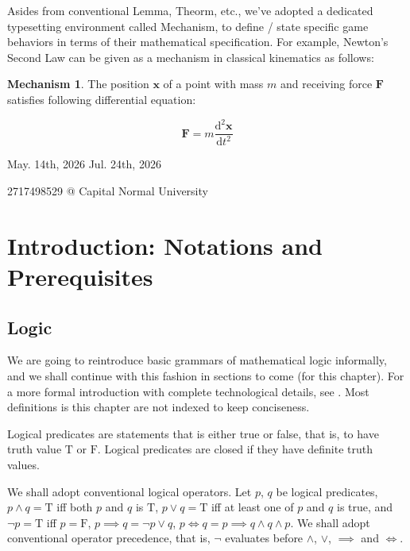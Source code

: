 \documentclass{book}
\theoremstyle{definition}\newtheorem{mechanism}{Mechanism}
\theoremstyle{remark}\newtheorem*{remark}{Remark}
\newcommand{\true}{\mathrm{T}}
\newcommand{\false}{\mathrm{F}}
\begin{document}
Asides from conventional Lemma, Theorm, etc., we've adopted a dedicated typesetting environment called Mechanism, to define / state specific game behaviors in terms of their mathematical specification. For example, Newton's Second Law can be given as a mechanism in classical kinematics as follows:

\begin{mechanism}
	The position $\boldsymbol{x}$ of a point with mass $m$ and receiving force $\boldsymbol{F}$ satisfies following differential equation:
	
	\begin{equation*}
		\boldsymbol{F} = m\frac{\mathrm{d}^2\boldsymbol{x}}{\mathrm dt^2}
	\end{equation*}
\end{mechanism}

\begin{flushright}
	May. 14th, 2026
	Jul. 24th, 2026 
	
	2717498529 @ Capital Normal University
\end{flushright}

\tableofcontents

\mainmatter

\chapter{Introduction: Notations and Prerequisites}

\section{Logic}

We are going to reintroduce basic grammars of mathematical logic informally, and we shall continue with this fashion in sections to come (for this chapter). For a more formal introduction with complete technological details, see \cite{GTM53-Ch1}. Most definitions is this chapter are not indexed to keep conciseness.

Logical predicates are statements that is either true or false, that is, to have truth value $\true$ or $\false$. Logical predicates are closed if they have definite truth values.

We shall adopt conventional logical operators. Let $p$, $q$ be logical predicates, $p\land q = \true$ iff both $p$ and $q$ is $\true$, $p\lor q = \true$ iff at least one of $p$ and $q$ is true, and $\neg p = \true$ iff $p = \false$, $p\implies q = \neg p \lor q$, $p \iff q = p\implies q \land q\land p$. We shall adopt conventional operator precedence, that is,  $\neg$ evaluates before $\land$, $\lor$, $\implies$ and $\iff$.
\end{document}
